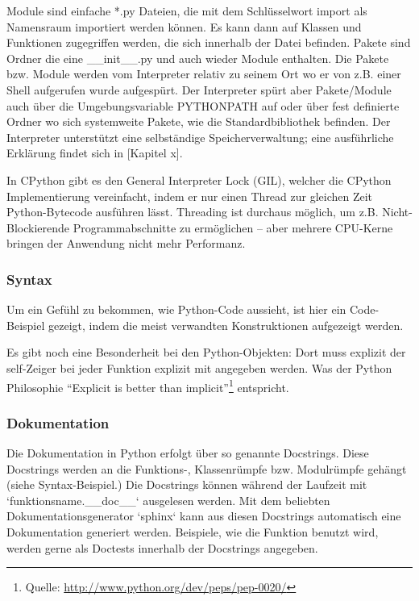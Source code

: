 Module sind einfache *.py Dateien, die mit dem Schlüsselwort import als
Namensraum importiert werden können. Es kann dann auf Klassen und Funktionen
zugegriffen werden, die sich innerhalb der Datei befinden. Pakete sind
Ordner die eine \_\_init\_\_.py und auch wieder Module enthalten. Die Pakete
bzw. Module werden vom Interpreter relativ zu seinem Ort wo er von z.B. einer
Shell aufgerufen wurde aufgespürt. Der Interpreter spürt aber Pakete/Module
auch über die Umgebungsvariable PYTHONPATH auf oder über fest definierte
Ordner wo sich systemweite Pakete, wie die Standardbibliothek befinden.
Der Interpreter unterstützt eine selbständige Speicherverwaltung; eine
ausführliche Erklärung findet sich in [Kapitel x].

In CPython gibt es den General Interpreter Lock (GIL), welcher die CPython
Implementierung vereinfacht, indem er nur einen Thread zur gleichen Zeit
Python-Bytecode ausführen lässt. Threading ist durchaus möglich, um z.B.
Nicht-Blockierende Programmabschnitte zu ermöglichen -- aber mehrere CPU-Kerne
bringen der Anwendung nicht mehr Performanz.\cite{pyref-reference}


\subsubsection{Syntax}


Um ein Gefühl zu bekommen, wie Python-Code aussieht, ist hier ein Code-Beispiel
gezeigt, indem die meist verwandten Konstruktionen aufgezeigt werden.





Es gibt noch eine Besonderheit bei den Python-Objekten: Dort muss explizit der
self-Zeiger bei jeder Funktion explizit mit angegeben werden. Was der Python
Philosophie  “Explicit is better than implicit”\footnote{Quelle: \url{http://www.python.org/dev/peps/pep-0020/}} entspricht.


\subsubsection{Dokumentation}


Die Dokumentation in Python erfolgt über so genannte Docstrings. Diese
Docstrings werden an die Funktions-, Klassenrümpfe bzw. Modulrümpfe gehängt
(siehe Syntax-Beispiel.) Die Docstrings können während der Laufzeit mit
`funktionsname.\_\_doc\_\_` ausgelesen werden. Mit dem beliebten
Dokumentationsgenerator `sphinx` kann aus diesen Docstrings automatisch
eine Dokumentation generiert werden.
Beispiele, wie die Funktion benutzt wird, werden gerne als Doctests innerhalb
der Docstrings angegeben.


